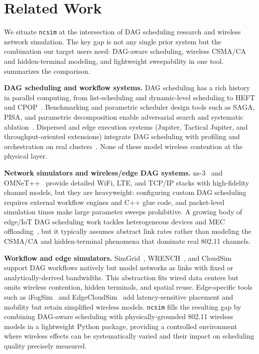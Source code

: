 \documentclass[conference]{IEEEtran}
\newcommand{\ncsim}{\texttt{ncsim}}
\begin{document}
\section{Related Work}
\label{sec:related}

We situate \ncsim{} at the intersection of DAG scheduling research and
wireless network simulation.  The key gap is not any single prior system
but the combination our target users need: DAG-aware scheduling, wireless
CSMA/CA and hidden-terminal modeling, and lightweight sweepability in one
tool.   summarizes the comparison.

\textbf{DAG scheduling and workflow systems.}
DAG scheduling has a rich history in parallel computing, from
list-scheduling and dynamic-level scheduling to HEFT and
CPOP~\cite{Adam1974ListSchedules,KwokAhmad1999Survey,Sih1993DLS,heft}.
Benchmarking and parametric scheduler design tools such as SAGA, PISA,
and parametric decomposition enable adversarial search and systematic
ablation~\cite{Coleman2024PISA,SAGARepo,Coleman2024Parametric}.
Dispersed and edge execution systems (Jupiter, Tactical Jupiter, and
throughput-oriented extensions) integrate DAG scheduling with
profiling and orchestration on real
clusters~\cite{Ghosh2021Jupiter,Poylisher2021TacticalJupiter,Zhao2021TPHEFT}.
None of these model wireless contention at the physical layer.

\textbf{Network simulators and wireless/edge DAG systems.}
ns-3~\cite{ns3} and OMNeT++~\cite{omnetpp} provide detailed WiFi, LTE,
and TCP/IP stacks with high-fidelity channel models, but they are
heavyweight: configuring custom DAG scheduling requires external workflow
engines and C++ glue code, and packet-level simulation times make large
parameter sweeps prohibitive.  A growing body of edge/IoT DAG scheduling
work tackles heterogeneous devices and MEC
offloading~\cite{Suryavansh2020IBOT,Li2022IBDASH,Li2024MTEC,Yi2017LAVEA,Zhang2019HeteroEdge,Lin2019Petrel,Liang2021JointOffloading,Li2024EnergyConstrained,Long2025SecDS,Chiang2016FogIoT,Chiang2017Fog10Q,Kim2020CodedEdge},
but it typically assumes abstract link rates rather than modeling the
CSMA/CA and hidden-terminal phenomena that dominate real 802.11 channels.

\textbf{Workflow and edge simulators.}
SimGrid~\cite{simgrid}, WRENCH~\cite{wrench}, and CloudSim~\cite{cloudsim}
support DAG workflows natively but model networks as links with fixed or
analytically-derived bandwidths.  This abstraction fits wired data
centers but omits wireless contention, hidden terminals, and spatial
reuse.  Edge-specific tools such as iFogSim~\cite{ifogsim} and
EdgeCloudSim~\cite{edgecloudsim} add latency-sensitive placement and
mobility but retain simplified wireless models.  \ncsim{} fills the
resulting gap by combining DAG-aware scheduling with physically-grounded
802.11 wireless models in a lightweight Python package, providing a
controlled environment where wireless effects can be systematically
varied and their impact on scheduling quality precisely measured.
\end{document}
